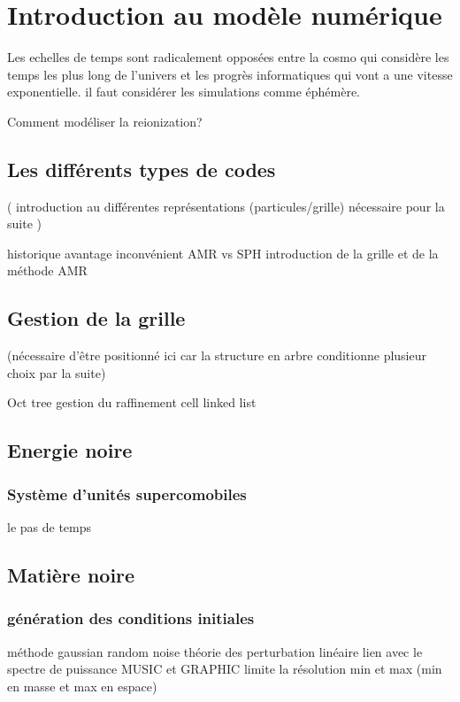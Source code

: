 \chapter{Introduction au modèle numérique}\label{ch:introduction}

Les echelles de temps sont radicalement opposées entre la cosmo qui considère les temps les plus long de l'univers et les progrès informatiques qui vont a une vitesse exponentielle. il faut considérer les simulations comme éphémère.

Comment modéliser la reionization?

\section{Les différents types de codes}

( introduction au différentes représentations (particules/grille) nécessaire pour la suite )

historique
avantage inconvénient AMR vs SPH
introduction de la grille et de la méthode AMR

\section{Gestion de la grille}

(nécessaire d'être positionné ici car la structure en arbre conditionne plusieur choix par la suite)

Oct tree
gestion du raffinement
cell linked list

\section{Energie noire}

\subsection{Système d'unités supercomobiles}

le pas de temps

\section{Matière noire}

\subsection{génération des conditions initiales}

méthode
gaussian random noise
théorie des perturbation linéaire
lien avec le spectre de puissance
MUSIC et GRAPHIC
limite la résolution min et max (min en masse et max en espace)


